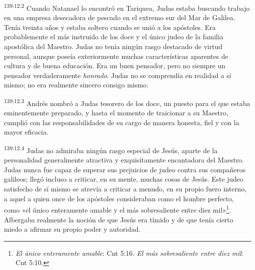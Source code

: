 \par
\textsuperscript{139:12.2} Cuando Natanael lo encontró en Tariquea, Judas estaba buscando trabajo en una empresa desecadora de pescado en el extremo sur del Mar de Galilea. Tenía treinta años y estaba soltero cuando se unió a los apóstoles. Era probablemente el más instruido de los doce y el único judeo de la familia apostólica del Maestro. Judas no tenía ningún rasgo destacado de virtud personal, aunque poseía exteriormente muchas características aparentes de cultura y de buena educación. Era un buen pensador, pero no siempre un pensador verdaderamente \textit{honrado}. Judas no se comprendía en realidad a sí mismo; no era realmente sincero consigo mismo.

\par
\textsuperscript{139:12.3} Andrés nombró a Judas tesorero de los doce, un puesto para el que estaba eminentemente preparado, y hasta el momento de traicionar a su Maestro, cumplió con las responsabilidades de su cargo de manera honesta, fiel y con la mayor eficacia.

\par
\textsuperscript{139:12.4} Judas no admiraba ningún rasgo especial de Jesús, aparte de la personalidad generalmente atractiva y exquisitamente encantadora del Maestro. Judas nunca fue capaz de superar sus prejuicios de judeo contra sus compañeros galileos; llegó incluso a criticar, en su mente, muchas cosas de Jesús. Este judeo satisfecho de sí mismo se atrevía a criticar a menudo, en su propio fuero interno, a aquel a quien once de los apóstoles consideraban como el hombre perfecto, como «el único enteramente amable y el más sobresaliente entre diez mil»\footnote{\textit{El único enteramente amable}: Cnt 5:16. \textit{El más sobresaliente entre diez mil}: Cnt 5:10.}. Albergaba realmente la noción de que Jesús era tímido y de que tenía cierto miedo a afirmar su propio poder y autoridad.

